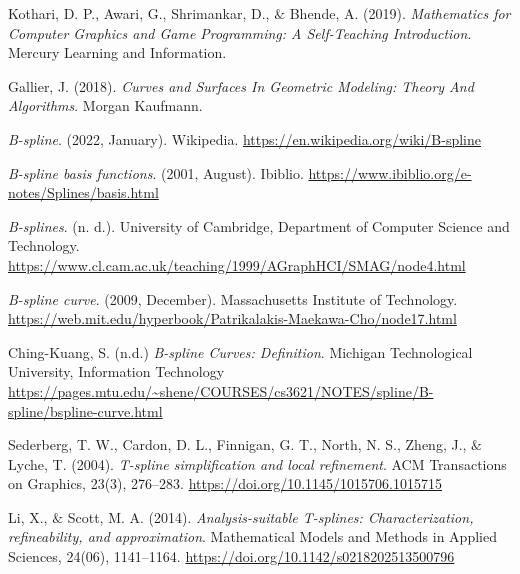 \documentclass{article}
\begin{document}
\vspace{12pt}

Kothari, D. P., Awari, G., Shrimankar, D., $\&$ Bhende, A. (2019). \emph{Mathematics for Computer Graphics and Game Programming: A Self-Teaching Introduction}. Mercury Learning and Information.

\vspace{12pt}

Gallier, J. (2018). \emph{Curves and Surfaces In Geometric Modeling: Theory And Algorithms}. Morgan Kaufmann.

\vspace{12pt}

\emph{B-spline}. (2022, January). Wikipedia. \url{https://en.wikipedia.org/wiki/B-spline}

\vspace{12pt}

\emph{B-spline basis functions}. (2001, August). Ibiblio. \url{https://www.ibiblio.org/e-notes/Splines/basis.html}

\vspace{12pt}

\emph{B-splines}. (n. d.). University of Cambridge, Department of Computer Science and Technology. \url{https://www.cl.cam.ac.uk/teaching/1999/AGraphHCI/SMAG/node4.html}

\vspace{12pt}

\emph{B-spline curve}. (2009, December). Massachusetts Institute of Technology. \url{https://web.mit.edu/hyperbook/Patrikalakis-Maekawa-Cho/node17.html}

\vspace{12pt}

Ching-Kuang, S. (n.d.) \emph{B-spline Curves: Definition}. Michigan Technological University, Information Technology \url{https://pages.mtu.edu/~shene/COURSES/cs3621/NOTES/spline/B-spline/bspline-curve.html}

\vspace{12pt}

Sederberg, T. W., Cardon, D. L., Finnigan, G. T., North, N. S., Zheng, J., $\&$ Lyche, T. (2004). \emph{T-spline simplification and local refinement}. ACM Transactions on Graphics, 23(3), 276–283. \url{https://doi.org/10.1145/1015706.1015715}

\vspace{12pt}

Li, X., $\&$ Scott, M. A. (2014). \emph{Analysis-suitable T-splines: Characterization, refineability, and approximation}. Mathematical Models and Methods in Applied Sciences, 24(06), 1141–1164. \url{https://doi.org/10.1142/s0218202513500796}
\end{document}
